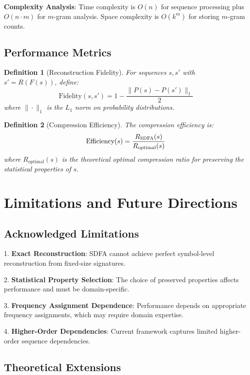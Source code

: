 \documentclass[11pt]{article}
\newtheorem{definition}{Definition}
\newcommand{\sdfa}{\textsc{SDFA}}
\begin{document}
\textbf{Complexity Analysis}: Time complexity is $O(n)$ for sequence processing plus $O(n \cdot m)$ for $m$-gram analysis. Space complexity is $O(k^m)$ for storing $m$-gram counts.

\subsection{Performance Metrics}

\begin{definition}[Reconstruction Fidelity]
For sequences $s, s'$ with $s' = R(F(s))$, define:
\[\text{Fidelity}(s, s') = 1 - \frac{\|P(s) - P(s')\|_1}{2}\]
where $\|\cdot\|_1$ is the $L_1$ norm on probability distributions.
\end{definition}

\begin{definition}[Compression Efficiency]
The compression efficiency is:
\[\text{Efficiency}(s) = \frac{R_{\sdfa}(s)}{R_{\text{optimal}}(s)}\]
where $R_{\text{optimal}}(s)$ is the theoretical optimal compression ratio for preserving the statistical properties of $s$.
\end{definition}

\section{Limitations and Future Directions}

\subsection{Acknowledged Limitations}

1. \textbf{Exact Reconstruction}: \sdfa{} cannot achieve perfect symbol-level reconstruction from fixed-size signatures.

2. \textbf{Statistical Property Selection}: The choice of preserved properties affects performance and must be domain-specific.

3. \textbf{Frequency Assignment Dependence}: Performance depends on appropriate frequency assignments, which may require domain expertise.

4. \textbf{Higher-Order Dependencies}: Current framework captures limited higher-order sequence dependencies.

\subsection{Theoretical Extensions}
\end{document}
